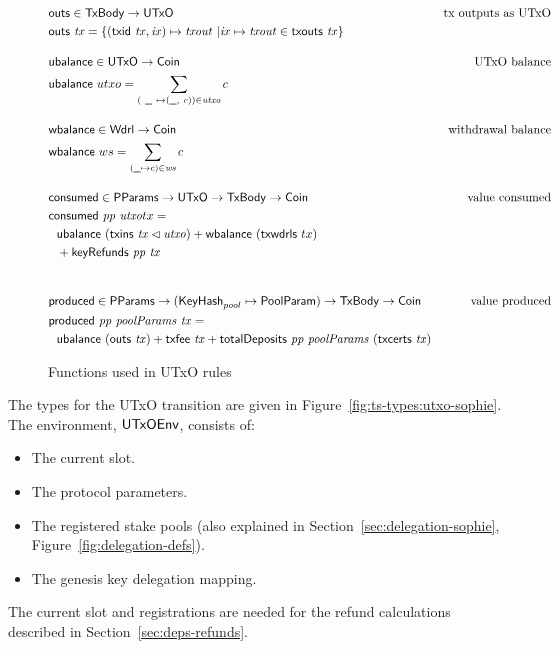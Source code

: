 \begin{figure}[htb]
  \begin{align*}
    & \fun{outs} \in \TxBody \to \UTxO
    & \text{tx outputs as UTxO} \\
    & \fun{outs} ~ \var{tx} =
        \left\{
          (\fun{txid} ~ \var{tx}, \var{ix}) \mapsto \var{txout} ~
          \middle|
          \var{ix} \mapsto \var{txout} \in \txouts{tx}
        \right\}
    \nextdef
    & \fun{ubalance} \in \UTxO \to \Coin
    & \text{UTxO balance} \\
    & \fun{ubalance} ~ utxo = \sum_{(~\wcard ~ \mapsto (\wcard, ~c)) \in \var{utxo}} c
    \nextdef
    & \fun{wbalance} \in \Wdrl \to \Coin
    & \text{withdrawal balance} \\
    & \fun{wbalance} ~ ws = \sum_{(\wcard\mapsto c)\in\var{ws}} c
    \nextdef
    & \fun{consumed} \in \PParams \to \UTxO \to \TxBody \to \Coin
    & \text{value consumed} \\
    & \consumed{pp}{utxo}{tx} = \\
    & ~~\ubalance{(\txins{tx} \restrictdom \var{utxo})} +
        \fun{wbalance}~(\fun{txwdrls}~{tx}) \\
    & ~~ + \keyRefunds{pp}{tx} \\
    \nextdef
    & \fun{produced} \in \PParams \to (\KeyHash_{pool}\mapsto\PoolParam) \to \TxBody \to \Coin
    & \text{value produced} \\
    & \fun{produced}~\var{pp}~\var{poolParams}~\var{tx} = \\
    &~~\ubalance{(\outs{tx})}
    + \txfee{tx} + \totalDeposits{pp}{poolParams}{(\txcerts{tx})}\\
  \end{align*}

  \caption{Functions used in UTxO rules}
  \label{fig:functions:utxo}
\end{figure}

\clearpage


The types for the UTxO transition are given in Figure~\ref{fig:ts-types:utxo-sophie}.
The environment, $\mathsf{UTxOEnv}$, consists of:

\begin{itemize}
  \item The current slot.
  \item The protocol parameters.
  \item The registered stake pools
    (also explained in Section~\ref{sec:delegation-sophie},
    Figure~\ref{fig:delegation-defs}).
  \item The genesis key delegation mapping.
\end{itemize}
The current slot and registrations are needed for the refund calculations
described in Section~\ref{sec:deps-refunds}.


